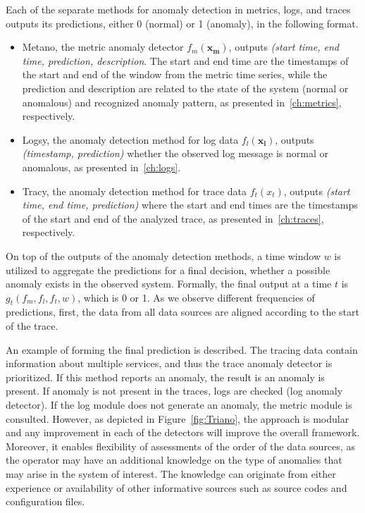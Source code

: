 Each of the separate methods for anomaly detection in metrics, logs, and traces outputs its predictions, either 0 (normal) or 1 (anomaly), in the following format.

\begin{itemize}
    \item Metano, the metric anomaly detector $f_m(\mathbf{x_m})$, outputs \textit{(start time, end time, prediction, description}. The start and end time are the timestamps of the start and end of the window from the metric time series, while the prediction and description are related to the state of the system (normal or anomalous) and recognized anomaly pattern, as presented in~\autoref{ch:metrics}, respectively.
    \item Logsy, the anomaly detection method for log data $f_l(\mathbf{x_l})$, outputs \textit{(timestamp, prediction)} whether the observed log message is normal or anomalous, as presented in~\autoref{ch:logs}.
    \item Tracy, the anomaly detection method for trace data $f_t(x_t)$, outputs \textit{(start time, end time, prediction)} where the start and end times are the timestamps of the start and end of the analyzed trace, as presented in~\autoref{ch:traces}, respectively.
\end{itemize}

On top of the outputs of the anomaly detection methods, a time window $w$ is utilized to aggregate the predictions for a final decision, whether a possible anomaly exists in the observed system. Formally, the final output at a time $t$ is $g_t(f_m, f_l, f_t, w)$, which  is 0 or 1. As we observe different frequencies of predictions, first, the data from all data sources are aligned according to the start of the trace. 

An example of forming the final prediction is described. The tracing data contain information about multiple services, and thus the trace anomaly detector is prioritized. If this method reports an anomaly, the result is an anomaly is present. If anomaly is not present in the traces, logs are checked (log anomaly detector). If the log module does not generate an anomaly, the metric module is consulted. However, as depicted in Figure~\ref{fig:Triano}, the  approach is modular and any improvement in each of the detectors will improve the overall framework. Moreover, it enables flexibility of assessments of the order of the data sources, as the operator may have an additional knowledge on the type of anomalies that may arise in the system of interest. The knowledge can originate from either experience or availability of other informative sources such as source codes and configuration files.

